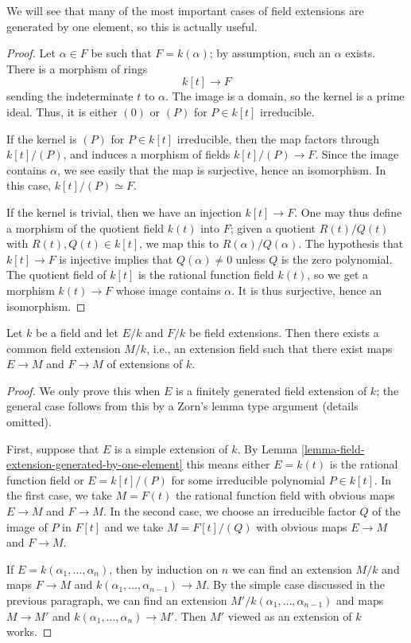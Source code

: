 \noindent
We will see that many of the most important cases of field extensions are
generated by one element, so this is actually useful.

\begin{proof}
Let $\alpha \in F$ be such that $F = k(\alpha)$; by assumption, such an
$\alpha$ exists. There is a morphism of rings
$$
k[t] \to F
$$
sending the indeterminate $t$ to $\alpha$. The image is a domain, so the
kernel is a prime ideal. Thus, it is either $(0)$ or $(P)$ for $P \in k[t]$
irreducible.

\medskip\noindent
If the kernel is $(P)$ for $P \in k[t]$ irreducible, then the map factors
through $k[t]/(P)$, and induces a morphism of fields $k[t]/(P) \to F$. Since
the image contains $\alpha$, we see easily that the map is surjective, hence
an isomorphism. In this case, $k[t]/(P) \simeq F$.

\medskip\noindent
If the kernel is trivial, then we have an injection $k[t] \to F$.
One may thus define a morphism of the quotient field $k(t)$ into $F$; given a
quotient $R(t)/Q(t)$ with $R(t), Q(t) \in k[t]$, we map this to
$R(\alpha)/Q(\alpha)$. The hypothesis that $k[t] \to F$ is injective implies
that $Q(\alpha) \neq 0$ unless $Q$ is the zero polynomial.
The quotient field of $k[t]$ is the rational function field $k(t)$, so we get
a morphism $k(t) \to F$
whose image contains $\alpha$. It is thus surjective, hence an isomorphism.
\end{proof}

\begin{lemma}
\label{lemma-common-extension-field}
Let $k$ be a field and let $E/k$ and $F/k$ be field extensions.
Then there exists a common field extension $M/k$, i.e., an extension
field such that there exist maps $E \to M$ and $F \to M$ of extensions of $k$.
\end{lemma}

\begin{proof}
We only prove this when $E$ is a finitely generated field extension
of $k$; the general case follows from this by a Zorn's lemma type argument
(details omitted).

\medskip\noindent
First, suppose that $E$ is a simple extension of $k$. By
Lemma \ref{lemma-field-extension-generated-by-one-element}
this means either $E = k(t)$ is the rational function field
or $E = k[t]/(P)$ for some irreducible polynomial $P \in k[t]$.
In the first case, we take $M = F(t)$ the rational function field
with obvious maps $E \to M$ and $F \to M$. In the second case, we
choose an irreducible factor $Q$ of the image of $P$ in $F[t]$
and we take $M = F[t]/(Q)$ with obvious maps $E \to M$ and $F \to M$.

\medskip\noindent
If $E = k(\alpha_1, \ldots, \alpha_n)$, then by induction on $n$
we can find an extension $M/k$ and maps $F \to M$ and
$k(\alpha_1, \ldots, \alpha_{n - 1}) \to M$. By the simple
case discussed in the previous paragraph,
we can find an extension $M'/k(\alpha_1, \ldots, \alpha_{n - 1})$
and maps $M \to M'$ and $k(\alpha_1, \ldots, \alpha_n) \to M'$.
Then $M'$ viewed as an extension of $k$ works.
\end{proof}




